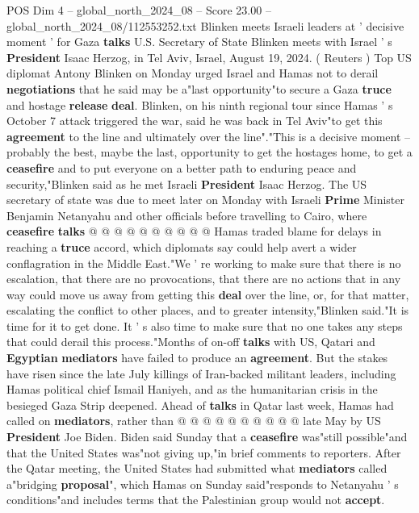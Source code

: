 \begin{textsample}{POS Dim 4 – global\_north\_2024\_08 – Score 23.00 – global\_north\_2024\_08/112553252.txt}  \label{ex:f4_pos_166}
Blinken meets Israeli leaders at ' decisive moment ' for Gaza \textbf{talks} U.S.
Secretary of State Blinken meets with Israel ' s \textbf{President} Isaac Herzog, in Tel Aviv, Israel, August 19, 2024. ( Reuters ) Top US diplomat Antony Blinken on Monday urged Israel and Hamas not to derail \textbf{negotiations} that he said may be a"last opportunity"to secure a Gaza \textbf{truce} and hostage \textbf{release} \textbf{deal}.
Blinken, on his ninth regional tour since Hamas ' s October 7 attack triggered the war, said he was back in Tel Aviv"to get this \textbf{agreement} to the line and ultimately over the line"."This is a decisive moment -- probably the best, maybe the last, opportunity to get the hostages home, to get a \textbf{ceasefire} and to put everyone on a better path to enduring peace and security,"Blinken said as he met Israeli \textbf{President} Isaac Herzog.
The US secretary of state was due to meet later on Monday with Israeli \textbf{Prime} Minister Benjamin Netanyahu and other officials before travelling to Cairo, where \textbf{ceasefire} \textbf{talks} @ @ @ @ @ @ @ @ @ @ Hamas traded blame for delays in reaching a \textbf{truce} accord, which diplomats say could help avert a wider conflagration in the Middle East."We ' re working to make sure that there is no escalation, that there are no provocations, that there are no actions that in any way could move us away from getting this \textbf{deal} over the line, or, for that matter, escalating the conflict to other places, and to greater intensity,"Blinken said."It is time for it to get done.
It ' s also time to make sure that no one takes any steps that could derail this process."Months of on-off \textbf{talks} with US, Qatari and \textbf{Egyptian} \textbf{mediators} have failed to produce an \textbf{agreement}.
But the stakes have risen since the late July killings of Iran-backed militant leaders, including Hamas political chief Ismail Haniyeh, and as the humanitarian crisis in the besieged Gaza Strip deepened.
Ahead of \textbf{talks} in Qatar last week, Hamas had called on \textbf{mediators}, rather than @ @ @ @ @ @ @ @ @ @ late May by US \textbf{President} Joe Biden.
Biden said Sunday that a \textbf{ceasefire} was"still possible"and that the United States was"not giving up,"in brief comments to reporters.
After the Qatar meeting, the United States had submitted what \textbf{mediators} called a"bridging \textbf{proposal}", which Hamas on Sunday said"responds to Netanyahu ' s conditions"and includes terms that the Palestinian group would not \textbf{accept}.

\end{textsample}
